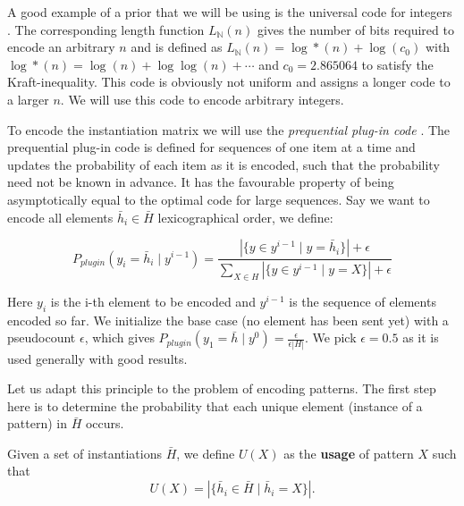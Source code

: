 \documentclass{llncs}
\begin{document}
A good example of a prior that we will be using is the universal code for integers \cite{integerprior}. The corresponding length function $L_{\mathbb{N}}(n)$ gives the number of bits required to encode an arbitrary $n$ and is defined as $L_{\mathbb{N}}(n) = \log*(n) + \log(c_0)$ with $\log*(n) = \log(n) + \log \log(n) + \cdots$ and $c_0=2.865064$ to satisfy the Kraft-inequality. This code is obviously not uniform and assigns a longer code to a larger $n$. We will use this code to encode arbitrary integers.

To encode the instantiation matrix we will use the \emph{prequential plug-in code} \cite{ppcode}. The prequential plug-in code is defined for sequences of one item at a time and updates the probability of each item as it is encoded, such that the probability need not be known in advance. It has the favourable property of being asymptotically equal to the optimal code for large sequences. Say we want to encode all elements $\bar{h}_i \in \bar{H}$ lexicographical order, we define:
\begin{definition}\label{plugin}
$$
P_{plugin}( y_i = \bar{h}_i \mid y^{i-1} ) = \frac{|\{y \in y^{i-1} \mid y = \bar{h}_i\}| + \epsilon }{\sum_{X \in H}|\{y \in y^{i-1} \mid y = X\}| + \epsilon}
$$
\end{definition}
Here $y_i$ is the i-th element to be encoded and $y^{i-1}$ is the sequence of elements encoded so far. We initialize the base case (no element has been sent yet) with a pseudocount $\epsilon$, which gives $P_{plugin}( y_1 = \bar{h} \mid y^{0} ) = \frac{\epsilon}{\epsilon|H|}$. We pick $\epsilon=0.5$ as it is used generally with good results.

Let us adapt this principle to the problem of encoding patterns. The first step here is to determine the probability that each unique element (instance of a pattern) in $\bar{H}$ occurs. 

\begin{definition}\label{usage}
Given a set of instantiations $\bar{H}$, we define $U(X)$ as the \textbf{usage} of pattern $X$ such that
$$
	U(X) = |\{ \bar{h}_i \in \bar{H} \mid \bar{h}_i = X\}|.
$$
\end{definition}
\end{document}
